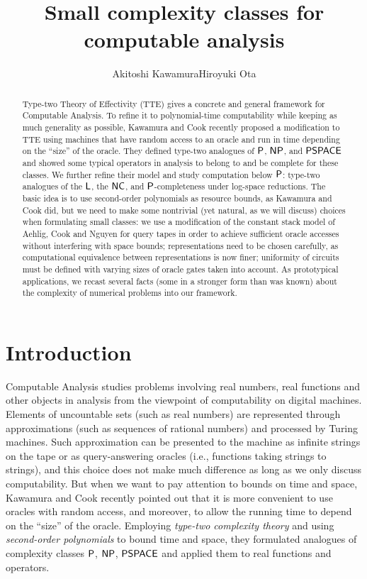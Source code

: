 \documentclass[envcountsame,orivec,oribibl]{llncs}
\title{Small complexity classes for computable analysis}
\author{Akitoshi Kawamura\qquad\qquad Hiroyuki Ota}
\institute{University of Tokyo}
\begin{document}
\maketitle

\begin{abstract}
Type-two Theory of Effectivity (TTE) gives a concrete and general framework for 
Computable Analysis. 
To refine it to polynomial-time computability 
while keeping as much generality as possible, 
Kawamura and Cook recently proposed a modification to TTE using 
machines that have random access to an oracle and 
run in time depending on the ``size'' of the oracle. 
They defined type-two analogues of 
$\mathsf{P}$, $\mathsf{NP}$, and $\mathsf{PSPACE}$ 
and showed some typical operators in analysis
to belong to and be complete for these classes. 
We further refine their model and study computation below $\mathsf{P}$: 
type-two analogues of 
the $\mathsf{L}$, 
the $\mathsf{NC}$, 
and $\mathsf{P}$-completeness under log-space reductions.
The basic idea is 
to use second-order polynomials as resource bounds, 
as Kawamura and Cook did, 
but we need to make some nontrivial (yet natural, as we will discuss) choices
when formulating small classes: 
we use a modification of the constant stack model 
of Aehlig, Cook and Nguyen for query tapes 
in order to achieve 
sufficient oracle accesses without interfering with space bounds; 
representations need to be chosen carefully, as 
computational equivalence between representations is now finer; 
uniformity of circuits must be defined 
with varying sizes of oracle gates taken into account. 
As prototypical applications, 
we recast several facts (some in a stronger form than was known) 
about the complexity of numerical problems 
into our framework. 
\end{abstract}

\section{Introduction}

Computable Analysis 
\cite{ko1991complexity,weihrauch00:_comput_analy}
studies problems 
involving real numbers, real functions and other objects in analysis
from the viewpoint of computability on digital machines. 
Elements of uncountable sets (such as real numbers) are
represented through approximations (such as sequences of rational numbers)
and processed by Turing machines. 
Such approximation can be 
presented to the machine 
as infinite strings on the tape 
or as query-answering oracles (i.e., functions taking strings to strings), 
and this choice does not make much difference 
as long as we only discuss computability. 
But when we want to pay attention to bounds on time and space, 
Kawamura and Cook \cite{kawamura2012complexity} recently pointed out that 
it is more convenient to use oracles with random access, 
and moreover, to allow the running time 
to depend on the ``size'' of the oracle. 
Employing \emph{type-two complexity theory} and 
using \emph{second-order polynomials} to bound time and space, 
they formulated analogues of complexity classes 
$\mathsf{P}$, $\mathsf{NP}$, $\mathsf{PSPACE}$ and 
applied them to real functions and operators. 
\end{document}
